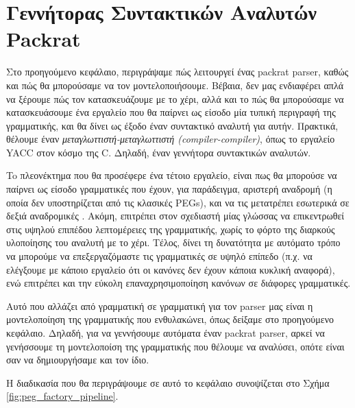 \chapter{ Γεννήτορας Συντακτικών Αναλυτών Packrat }
\label{ch:packrat_gen}

Στο προηγούμενο κεφάλαιο, περιγράψαμε πώς λειτουργεί ένας packrat parser, καθώς και πώς θα μπορούσαμε να τον μοντελοποιήσουμε.
Βέβαια, δεν μας ενδιαφέρει απλά να ξέρουμε πώς τον κατασκευάζουμε με το χέρι, αλλά και το πώς θα μπορούσαμε να κατασκευάσουμε ένα εργαλείο που θα παίρνει ως είσοδο μία τυπική περιγραφή της γραμματικής, και θα δίνει ως έξοδο έναν συντακτικό αναλυτή για αυτήν.
Πρακτικά, θέλουμε έναν \textit{μεταγλωττιστή-μεταγλωττιστή (compiler-compiler)}, όπως το εργαλείο YACC στον κόσμο της C. Δηλαδή, έναν γεννήτορα συντακτικών αναλυτών.

To πλεονέκτημα που θα προσέφερε ένα τέτοιο εργαλείο, είναι πως θα μπορούσε να παίρνει ως είσοδο γραμματικές που έχουν, για παράδειγμα, αριστερή αναδρομή (η οποία δεν υποστηρίζεται από τις κλασικές PEGs), και να τις μετατρέπει εσωτερικά σε δεξιά αναδρομικές \cite{Ford2002a}.
Ακόμη, επιτρέπει στον σχεδιαστή μίας γλώσσας να επικεντρωθεί στις υψηλού επιπέδου λεπτομέρειες της γραμματικής, χωρίς το φόρτο της διαρκούς υλοποίησης του αναλυτή με το χέρι.
Τέλος, δίνει τη δυνατότητα με αυτόματο τρόπο να μπορούμε να επεξεργαζόμαστε τις γραμματικές σε υψηλό επίπεδο (π.χ. να ελέγξουμε με κάποιο εργαλείο ότι οι κανόνες δεν έχουν κάποια κυκλική αναφορά), ενώ επιτρέπει και την εύκολη επαναχρησιμοποίηση κανόνων σε διάφορες γραμματικές.

Αυτό που αλλάζει από γραμματική σε γραμματική για τον parser μας είναι η μοντελοποίηση της γραμματικής που ενθυλακώνει, όπως δείξαμε στο προηγούμενο κεφάλαιο.
Δηλαδή, για να γεννήσουμε αυτόματα έναν packrat parser, αρκεί να γενήσσουμε τη μοντελοποίση της γραμματικής που θέλουμε να αναλύσει, οπότε είναι σαν να δημιουργήσαμε και τον ίδιο.

Η διαδικασία που θα περιγράψουμε σε αυτό το κεφάλαιο συνοψίζεται στο Σχήμα \ref{fig:peg_factory_pipeline}.

